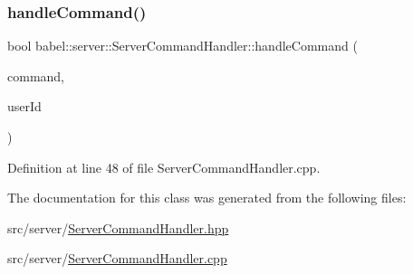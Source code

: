 \subsubsection{\texorpdfstring{handle\+Command()}{handleCommand()}}
{\footnotesize\ttfamily bool babel\+::server\+::\+Server\+Command\+Handler\+::handle\+Command (\begin{DoxyParamCaption}\item[{std\+::unique\+\_\+ptr$<$ \mbox{\hyperlink{classbabel_1_1common_1_1_a_command}{common\+::\+A\+Command}} $>$ \&}]{command,  }\item[{int32\+\_\+t}]{user\+Id }\end{DoxyParamCaption})}



Definition at line 48 of file Server\+Command\+Handler.\+cpp.



The documentation for this class was generated from the following files\+:\begin{DoxyCompactItemize}
\item 
src/server/\mbox{\hyperlink{_server_command_handler_8hpp}{Server\+Command\+Handler.\+hpp}}\item 
src/server/\mbox{\hyperlink{_server_command_handler_8cpp}{Server\+Command\+Handler.\+cpp}}\end{DoxyCompactItemize}
